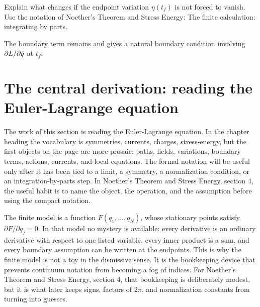 \begin{exercise}
Explain what changes if the endpoint variation \(\eta(t_f)\) is not forced to vanish.  Use the notation of Noether's Theorem and Stress Energy: The finite calculation: integrating by parts.
\begin{answer}
The boundary term remains and gives a natural boundary condition involving \(\partial L/\partial\dot q\) at \(t_f\).
\end{answer}
\end{exercise}



\section{The central derivation: reading the Euler-Lagrange equation}













The work of this section is reading the Euler-Lagrange equation.  In the chapter heading the vocabulary is symmetries, currents, charges, stress-energy, but the first objects on the page are more prosaic: paths, fields, variations, boundary terms, actions, currents, and local equations.  The formal notation will be useful only after it has been tied to a limit, a symmetry, a normalization condition, or an integration-by-parts step.  In Noether's Theorem and Stress Energy, section 4, the useful habit is to name the object, the operation, and the assumption before using the compact notation.

The finite model is a function \(F(q_1,\ldots,q_N)\), whose stationary points satisfy \( \partial F/\partial q_j=0 \).  In that model no mystery is available: every derivative is an ordinary derivative with respect to one listed variable, every inner product is a sum, and every boundary assumption can be written at the endpoints.  This is why the finite model is not a toy in the dismissive sense.  It is the bookkeeping device that prevents continuum notation from becoming a fog of indices.  For Noether's Theorem and Stress Energy, section 4, that bookkeeping is deliberately modest, but it is what later keeps signs, factors of \(2\pi\), and normalization constants from turning into guesses.

